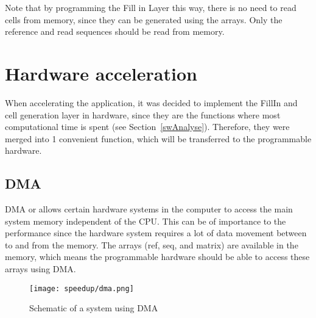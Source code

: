 Note that by programming the Fill in Layer this way, there is no need to read cells from memory, since they can be generated using the arrays. Only the reference and read sequences should be read from memory. 

\section{Hardware acceleration}

When accelerating the application, it was decided to implement the FillIn and cell generation layer in hardware, since they are the functions where most computational time is spent (see Section~\ref{swAnalyse}). Therefore, they were merged into 1 convenient function, which will be transferred to the programmable hardware. 

\subsection{DMA}

DMA or  allows certain hardware systems in the computer to access the main system memory independent of the CPU. This can be of importance to the performance since the hardware system requires a lot of data movement between to and from the memory. The arrays (ref, seq, and matrix) are available in the memory, which means the programmable hardware should be able to access these arrays using DMA. 

\begin{figure}[H]
	\centering
	\texttt{[image: speedup/dma.png]}
	\caption{Schematic of a system using DMA}
	\label{fig:DMA}
\end{figure}

